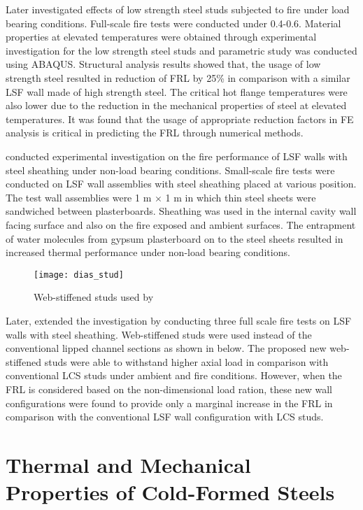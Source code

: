 Later \citet{Ariyanayagam2018c} investigated effects of low strength steel studs subjected to fire under load bearing conditions. Full-scale fire tests were conducted under 0.4-0.6. Material properties at elevated temperatures were obtained through experimental investigation for the low strength steel studs and parametric study was conducted using ABAQUS. Structural analysis results showed that, the usage of low strength steel resulted in reduction of FRL by 25\% in comparison with a similar LSF wall made of high strength steel. The critical hot flange temperatures were also lower due to the reduction in the mechanical properties of steel at elevated temperatures. It was found that the usage of appropriate reduction factors in FE analysis is critical in predicting the FRL through numerical methods. 

\citet{Dias2018a} conducted experimental investigation on the fire performance of LSF walls with steel sheathing under non-load bearing conditions. Small-scale fire tests were conducted on LSF wall assemblies with steel sheathing placed at various position. The test wall assemblies were 1 m $\times$ 1 m in which thin steel sheets were sandwiched between plasterboards. Sheathing was used in the internal cavity wall facing surface and also on the fire exposed and ambient surfaces. The entrapment of water molecules from gypsum plasterboard on to the steel sheets resulted in increased thermal performance under non-load bearing conditions.    
\begin{figure}[!htbp]
	\centering
		\texttt{[image: dias\_stud]}		
		\caption{Web-stiffened studs used by \citet{Dias2019c}}
		\label{fig:dias_stud}
\end{figure}
Later, \citet{Dias2019c} extended the investigation by conducting three full scale fire tests on LSF walls with steel sheathing. Web-stiffened studs were used instead of the conventional lipped channel sections as shown in  below. The proposed new web-stiffened studs were able to withstand higher axial load in comparison with conventional LCS studs under ambient and fire conditions. However, when the FRL is considered based on the non-dimensional load ration, these new wall configurations were found to provide only a marginal increase in the FRL in comparison with the conventional LSF wall configuration with LCS studs.

\section{Thermal and Mechanical Properties of Cold-Formed Steels}

